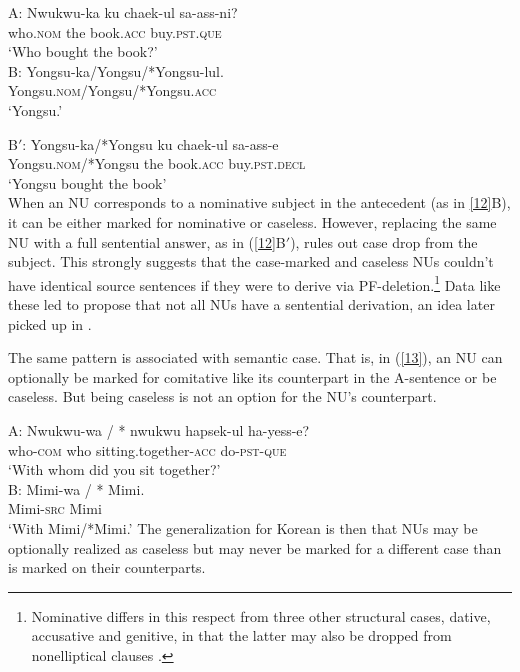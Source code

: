\documentclass[output=paper
                ,modfonts
                ,nonflat
	        ,collection
	        ,collectionchapter
	        ,collectiontoclongg
 	        ,biblatex
                ,babelshorthands
                ,newtxmath
                ,draftmode
                ,colorlinks, citecolor=brown
]{./langsci/langscibook}
\begin{document}
{  \ea
A: \gll Nwukwu-ka ku  chaek-ul  sa-ass-ni?\\
who.\textsc{nom} the book.\textsc{acc} buy.\textsc{pst.que}\\
\glt  `Who bought the book?'\\

B: \gll Yongsu-ka/Yongsu/*Yongsu-lul.\\
Yongsu.\textsc{nom}/Yongsu/*Yongsu.\textsc{acc}\\
\glt  `Yongsu.'

B$'$: \gll Yongsu-ka/*Yongsu  ku  chaek-ul  sa-ass-e\\
Yongsu.\textsc{nom}/*Yongsu the book.\textsc{acc} buy.\textsc{pst.decl}\\
\glt  `Yongsu bought the book'\\
\label{12}\z
%
When an NU corresponds to a nominative subject in the antecedent (as in \ref{12}B), it can be either marked for nominative or caseless.
However, replacing the same NU with a full sentential answer, as in (\ref{12}B$'$), rules out case drop from the subject. This strongly suggests that the case-marked and caseless NUs couldn't have identical source sentences if they were to derive via PF-deletion.\footnote{Nominative differs in this respect from three other structural cases, dative, accusative and genitive, in that the latter may also be dropped from nonelliptical clauses \citep[see][]{Morgan1989, Lee2016, Kim2016}.}  Data like these led \citet{Morgan1989} to propose that not all NUs have a sentential derivation, an idea later picked up in \citet{Barton1998}.

The same pattern is associated with semantic case. That is, in (\ref{13}), an NU can optionally be
marked for comitative like its counterpart in the A-sentence or be caseless. But being caseless is not an option for the NU's counterpart.

\ea
A:
\gll Nwukwu-wa         /  *  nwukwu  hapsek-ul                     ha-yess-e?\\
     who-\textsc{com}  {} {} who     sitting.together-\textsc{acc} do-\textsc{pst}-\textsc{que}\\
\glt  `With whom did you sit together?'\\

B:
\gll Mimi-wa / * Mimi.\\
     Mimi-\textsc{src} {} {} Mimi\\
\glt `With Mimi/*Mimi.' \label{13}\z
%
The generalization for Korean is then that NUs may be optionally realized as caseless but may never be marked for a different case than is marked on their counterparts.

}
\end{document}

